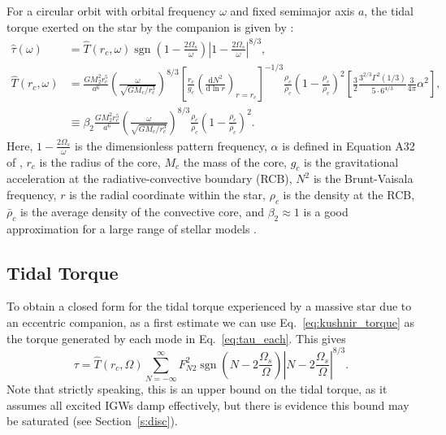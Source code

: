 \documentclass[
        fleqn,
        usenatbib,
        referee,
    ]{mnras}
\newcommand*{\rd}[2]{\frac{\mathrm{d}#1}{\mathrm{d}#2}}
\newcommand*{\abs}[1]{\left|#1\right|}
\newcommand*{\p}[1]{\left(#1\right)}
\newcommand*{\s}[1]{\left[#1\right]}
\DeclareMathOperator*{\sgn}{sgn}
\begin{document}
For a circular orbit with orbital frequency $\omega$ and fixed semimajor axis
$a$, the tidal torque exerted on the star by the companion is given by
\citealt{kushnir}:
\begin{align}
    \hat{\tau}(\omega) &= \hat{T}(r_c, \omega) \sgn\p{1 - \frac{2\Omega_s}{\omega}}
        \abs{1 - \frac{2\Omega_s}{\omega}}^{8/3}
            \label{eq:kushnir_torque},\\
    \hat{T}(r_c, \omega) &= \frac{GM_2^2r_c^5}{a^6}
        \p{\frac{\omega}{\sqrt{GM_c/r_c^3}}}^{8/3}
        \s{\frac{r_c}{g_c}\p{\rd{N^2}{\ln r}}_{r = r_c}}^{-1/3}
            \frac{\rho_c}{\bar{\rho}_c} \p{1 - \frac{\rho_c}{\bar{\rho}_c}}^2
            \s{\frac{3}{2}\frac{3^{2/3}\Gamma^2(1/3)}{5 \cdot
                6^{4/3}} \frac{3}{4\pi}\alpha^2},\nonumber\\
        &\equiv \beta_2\frac{GM_2^2r_c^5}{a^6}
            \p{\frac{\omega}{\sqrt{GM_c/r_c^3}}}^{8/3}
            \frac{\rho_c}{\bar{\rho}_c} \p{1 - \frac{\rho_c}{\bar{\rho}_c}}^2.
\end{align}
Here, $1 - \frac{2\Omega_s}{\omega}$ is the dimensionless pattern frequency,
$\alpha$ is defined in Equation A32 of \citealt{kushnir}, $r_c$ is the radius of
the core, $M_c$ the mass of the core, $g_c$ is the gravitational acceleration at
the radiative-convective boundary (RCB), $N^2$ is the Brunt-Vaisala frequency,
$r$ is the radial coordinate within the star, $\rho_c$ is the density at the
RCB, $\bar{\rho}_c$ is the average density of the convective core, and $\beta_2
\approx 1$ is a good approximation for a large range of stellar models
\citep{kushnir}.

\subsection{Tidal Torque}

To obtain a closed form for the tidal torque experienced by a massive star due
to an eccentric companion, as a first estimate we can use
Eq.~\eqref{eq:kushnir_torque} as the torque generated by each mode in
Eq.~\eqref{eq:tau_each}. This gives
\begin{equation}
    \tau = \hat{T}(r_c, \Omega) \sum\limits_{N = -\infty}^\infty
        F_{N2}^2 \sgn\p{N - 2\frac{\Omega_s}{\Omega}}
            \abs{N - 2\frac{\Omega_s}{\Omega}}^{8/3}.\label{eq:tau_sum}
\end{equation}
Note that strictly speaking, this is an upper bound on the tidal torque, as it
assumes all excited IGWs damp effectively, but there is evidence this bound may
be saturated (see Section~\ref{s:disc}).
\end{document}
